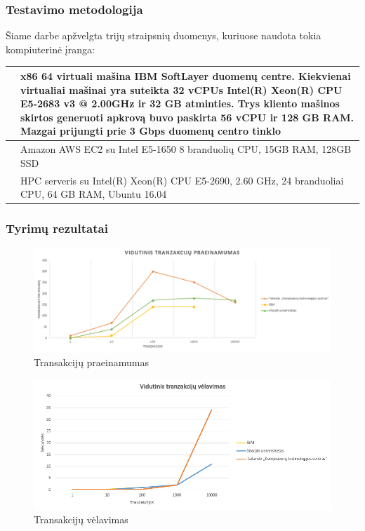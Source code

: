\documentclass{VUMIFPSkursinis}
\begin{document}
\subsubsection{Testavimo metodologija}
Šiame darbe apžvelgta trijų straipsnių duomenys, kuriuose naudota tokia kompiuterinė įranga:
\begin{center}
\begin{tabular}{ | m{5em} | m{10cm}| } 
\hline
\cite{IMBResearch}& x86 64 virtuali mašina IBM SoftLayer duomenų centre. 
Kiekvienai virtualiai mašinai yra suteikta 32 vCPUs Intel(R) Xeon(R)
CPU E5-2683 v3 @ 2.00GHz ir 32 GB atminties. Trys kliento mašinos skirtos generuoti apkrovą buvo paskirta
56 vCPU ir 128 GB RAM. Mazgai prijungti prie 3 Gbps duomenų centro tinklo \\ 
\hline
\cite{ThailandPerf}& Amazon AWS EC2
su Intel E5-1650 8 branduolių CPU,
15GB RAM, 128GB SSD \\ 
\hline
\cite{ShaFabPerf}& HPC serveris
su Intel(R) Xeon(R) CPU E5-2690, 2.60 GHz, 24 branduoliai
CPU, 64 GB RAM, Ubuntu 16.04 \\ 
\hline
\end{tabular}
\end{center}

\subsubsection{Tyrimų rezultatai}
\begin{figure}[H]
\centering
\includegraphics[scale=0.6]{img/Praein}
\caption{Transakcijų praeinamumas} %
\label{img:mlp}
\end{figure} 
\begin{figure}[H]
\centering
\includegraphics[scale=0.6]{img/Velav}
\caption{Transakcijų vėlavimas} %
\label{img:mlp}
\end{figure} 
\end{document}
